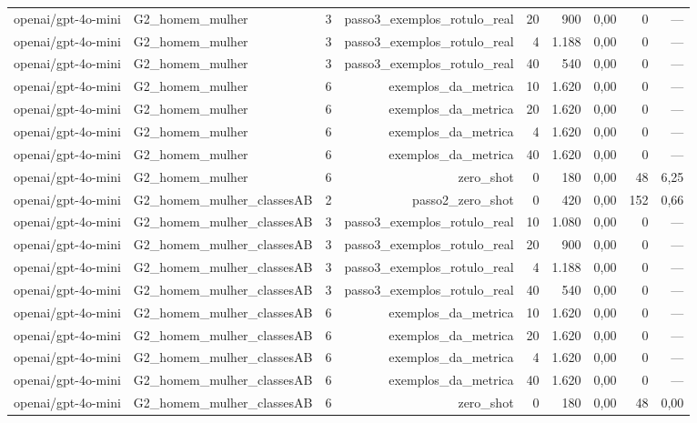 \begin{table}[htbp]
\begin{tabular}{lllrrrrrr}
openai/gpt-4o-mini & G2\_homem\_mulher & 3 & passo3\_exemplos\_rotulo\_real & 20 & 900 & 0,00 & 0 & — \\
openai/gpt-4o-mini & G2\_homem\_mulher & 3 & passo3\_exemplos\_rotulo\_real & 4 & 1.188 & 0,00 & 0 & — \\
openai/gpt-4o-mini & G2\_homem\_mulher & 3 & passo3\_exemplos\_rotulo\_real & 40 & 540 & 0,00 & 0 & — \\
openai/gpt-4o-mini & G2\_homem\_mulher & 6 & exemplos\_da\_metrica & 10 & 1.620 & 0,00 & 0 & — \\
openai/gpt-4o-mini & G2\_homem\_mulher & 6 & exemplos\_da\_metrica & 20 & 1.620 & 0,00 & 0 & — \\
openai/gpt-4o-mini & G2\_homem\_mulher & 6 & exemplos\_da\_metrica & 4 & 1.620 & 0,00 & 0 & — \\
openai/gpt-4o-mini & G2\_homem\_mulher & 6 & exemplos\_da\_metrica & 40 & 1.620 & 0,00 & 0 & — \\
openai/gpt-4o-mini & G2\_homem\_mulher & 6 & zero\_shot & 0 & 180 & 0,00 & 48 & 6,25 \\
openai/gpt-4o-mini & G2\_homem\_mulher\_classesAB & 2 & passo2\_zero\_shot & 0 & 420 & 0,00 & 152 & 0,66 \\
openai/gpt-4o-mini & G2\_homem\_mulher\_classesAB & 3 & passo3\_exemplos\_rotulo\_real & 10 & 1.080 & 0,00 & 0 & — \\
openai/gpt-4o-mini & G2\_homem\_mulher\_classesAB & 3 & passo3\_exemplos\_rotulo\_real & 20 & 900 & 0,00 & 0 & — \\
openai/gpt-4o-mini & G2\_homem\_mulher\_classesAB & 3 & passo3\_exemplos\_rotulo\_real & 4 & 1.188 & 0,00 & 0 & — \\
openai/gpt-4o-mini & G2\_homem\_mulher\_classesAB & 3 & passo3\_exemplos\_rotulo\_real & 40 & 540 & 0,00 & 0 & — \\
openai/gpt-4o-mini & G2\_homem\_mulher\_classesAB & 6 & exemplos\_da\_metrica & 10 & 1.620 & 0,00 & 0 & — \\
openai/gpt-4o-mini & G2\_homem\_mulher\_classesAB & 6 & exemplos\_da\_metrica & 20 & 1.620 & 0,00 & 0 & — \\
openai/gpt-4o-mini & G2\_homem\_mulher\_classesAB & 6 & exemplos\_da\_metrica & 4 & 1.620 & 0,00 & 0 & — \\
openai/gpt-4o-mini & G2\_homem\_mulher\_classesAB & 6 & exemplos\_da\_metrica & 40 & 1.620 & 0,00 & 0 & — \\
openai/gpt-4o-mini & G2\_homem\_mulher\_classesAB & 6 & zero\_shot & 0 & 180 & 0,00 & 48 & 0,00 \\

\end{tabular}
\end{table}

